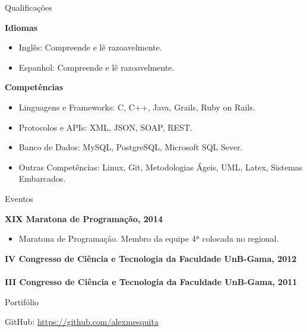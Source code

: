 \documentclass{resume} %
\begin{document}
\begin{rSection}{Qualificações}

\textbf{Idiomas}
\begin{itemize}
	\item Inglês: Compreende e lê razoavelmente.
	\item Espanhol: Compreende e lê razoavelmente.
\end{itemize}

\textbf{Competências}
\begin{itemize}
	\item Linguagens e Frameworks: C, C++, Java, Grails, Ruby on Rails.
	\item Protocolos e APIs: XML, JSON, SOAP, REST.
	\item Banco de Dados: MySQL, PostgreSQL, Microsoft SQL Sever.
	\item Outras Competências: Linux, Git, Metodologias Ágeis, UML, Latex, Sistemas Embarcados.
\end{itemize}

\end{rSection}


\begin{rSection}{Eventos}

\textbf{XIX Maratona de Programação, 2014}
\begin{itemize}
	\item Maratona de Programação. Membro da equipe 4ª colocada no regional.
\end{itemize}

\textbf{IV Congresso de Ciência e Tecnologia da Faculdade UnB-Gama, 2012}
\\
\\
\textbf{III Congresso de Ciência e Tecnologia da Faculdade UnB-Gama, 2011}

\end{rSection}


\begin{rSection}{Portifólio}

GitHub: \url{https://github.com/alexmesquita}

\end{rSection}
\end{document}
